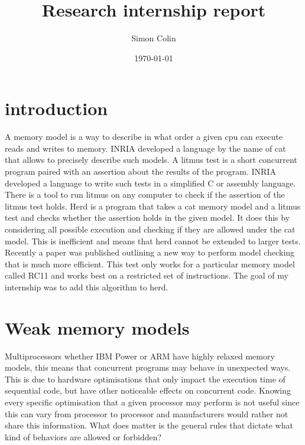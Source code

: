 \documentclass[a4,12pt]{article}
\title{Research internship report}
\author{Simon Colin}
\date{\today}
\begin{document}
\maketitle


\section{introduction}
A memory model is a way to describe in what order a given cpu can execute reads and writes to memory. INRIA developed a language by the name of cat that allows to precisely describe such models.
A litmus test is a short concurrent program paired with an assertion about the results of the program. INRIA developed a language to write such tests in a simplified C or assembly language. There is a tool to run litmus on any computer to check if the assertion of the litmus test holds.
Herd is a program that takes a cat memory model and a litmus test and checks whether the assertion holds in the given model. It does this by considering all possible execution and checking if they are allowed under the cat model. This is inefficient and means that herd cannot be extended to larger tests.
Recently a paper was published outlining a new way to perform model checking that is much more efficient. This test only works for a particular memory model called RC11 and works best on a restricted set of instructions. The goal of my internship was to add this algorithm to herd.

\section{Weak memory models}

Multiprocessors whether IBM Power or ARM have highly relaxed memory models, this means that concurrent programs may behave in unexpected ways. This is due to hardware optimisations that only impact the execution time of sequential code, but have other noticeable effects on concurrent code. Knowing every specific optimisation that a given processor may perform is not useful since this can vary from processor to processor and manufacturers would rather not share this information. What does matter is the general rules that dictate what kind of behaviors are allowed or forbidden?
\end{document}
